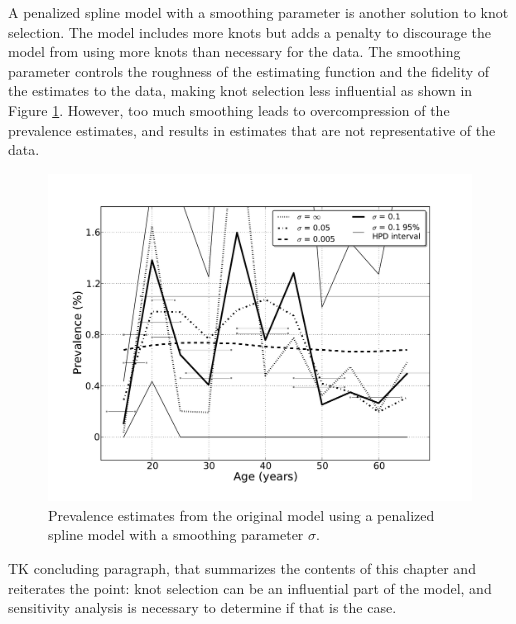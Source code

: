A penalized spline model with a smoothing parameter is another
solution to knot selection.  The model includes more knots but adds a
penalty to discourage the model from using more knots than necessary
for the data.  The smoothing parameter controls the roughness of the
estimating function and the fidelity of the estimates to the data,
making knot selection less influential as shown in Figure
\ref{fig:app-cocaine_smoothing}.  However, too much smoothing leads
to overcompression of the prevalence estimates, and results in
estimates that are not representative of the data.

    \begin{figure}[h]
        \begin{center}
            \includegraphics[width=\textwidth]{applications/cocaine_dependence-smoothing.pdf}
            \caption{Prevalence estimates from the original model
              using a penalized spline model with a smoothing
              parameter $\sigma$. }
        \label{fig:app-cocaine_smoothing}
        \end{center}
    \end{figure}

TK concluding paragraph, that summarizes the contents of this chapter
and reiterates the point: knot selection can be an influential part of
the model, and sensitivity analysis is necessary to determine if that
is the case.
